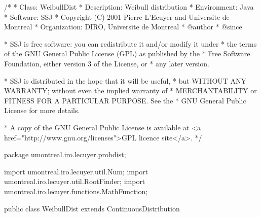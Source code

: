\begin{code}\begin{hide}
/*
 * Class:        WeibullDist
 * Description:  Weibull distribution
 * Environment:  Java
 * Software:     SSJ 
 * Copyright (C) 2001  Pierre L'Ecuyer and Universite de Montreal
 * Organization: DIRO, Universite de Montreal
 * @author       
 * @since

 * SSJ is free software: you can redistribute it and/or modify it under
 * the terms of the GNU General Public License (GPL) as published by the
 * Free Software Foundation, either version 3 of the License, or
 * any later version.

 * SSJ is distributed in the hope that it will be useful,
 * but WITHOUT ANY WARRANTY; without even the implied warranty of
 * MERCHANTABILITY or FITNESS FOR A PARTICULAR PURPOSE.  See the
 * GNU General Public License for more details.

 * A copy of the GNU General Public License is available at
   <a href="http://www.gnu.org/licenses">GPL licence site</a>.
 */
\end{hide}
package umontreal.iro.lecuyer.probdist;
\begin{hide}
import umontreal.iro.lecuyer.util.Num;
import umontreal.iro.lecuyer.util.RootFinder;
import umontreal.iro.lecuyer.functions.MathFunction;
\end{hide}
public class WeibullDist extends ContinuousDistribution\begin{hide} {
   private double alpha;
   private double lambda;
   private double delta;

   private static class Function implements MathFunction {
      private int n;
      private double xi[];
      private double lnXi[];
      private double sumLnXi = 0.0;
      private final double LN_EPS = Num.LN_DBL_MIN - Num.LN2;

      public Function (double x[], int n)
      {
         this.n = n;
         this.xi = new double[n];
         this.lnXi = new double[n];

         for (int i = 0; i < n; i++)
         {
            this.xi[i] = x[i];
            if (x[i] > 0.0)
               this.lnXi[i] = Math.log (x[i]);
            else
               this.lnXi[i] = LN_EPS;
            sumLnXi += this.lnXi[i];
         }
      }

      public double evaluate (double x)
      {
         if (x <= 0.0) return 1.0e200;
         double sumXiLnXi = 0.0;
         double sumXi = 0.0;
         double xalpha;

         for (int i = 0; i < n; i++)
         {
            xalpha = Math.pow (this.xi[i], x);
            sumXiLnXi += xalpha * lnXi[i];
            sumXi += xalpha;
         }

         return (x * (n * sumXiLnXi - sumLnXi * sumXi) - n * sumXi);
      }
   }

\end{hide}
\end{code}

